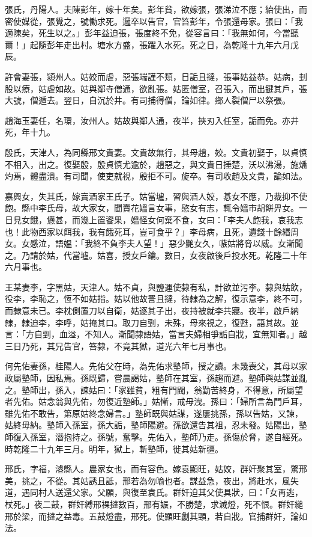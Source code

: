 \begin{pinyinscope}
張氏，丹陽人。夫陳彭年，嫁十年矣。彭年貧，欲嫁張，張涕泣不應；紿使出，而密使媒從，張覺之，號慟求死。邏卒以告官，官笞彭年，令張還母家。張曰：「我適陳矣，死生以之。」彭年益迫張，張度終不免，從容言曰：「我無如何，今當聽爾！」起隨彭年走出村。塘水方盛，張躍入水死。死之日，為乾隆十九年六月戊辰。

許會妻張，潁州人。姑姣而虐，惡張端謹不類，日詬且撻，張事姑益恭。姑病，刲股以療，姑虐如故。姑與鄰寺僧通，欲亂張。姑匿僧室，召張入，而出鍵其戶，張大號，僧遁去。翌日，自沉於井。有司捕得僧，論如律。鄉人裂僧尸以祭張。

趙海玉妻任，名環，汝州人。姑故與鄰人通，夜半，挾刃入任室，詬而免。亦井死，年十九。

殷氏，天津人，為同縣邢文貴妻。文貴故無行，其母趙，姣。文貴初娶于，以貞慎不相入，出之。復娶殷，殷貞慎尤逾於，趙惡之，與文貴日捶楚，沃以沸湯，施燔灼焉，體盡潰。有司聞，使吏就視，殷拒不可。旋卒。有司收趙及文貴，論如法。

嘉興女，失其氏，嫁賣酒家王氏子。姑當壚，習與酒人姣，惎女不應，乃裁抑不使飽。縣中李氏母，故大家女，聞賣花媼言女事，愍女有志，輒令媼市胡餅畀女。一日見女餓，憊甚，而幾上置餈果，媼怪女何棄不食，女曰：「李夫人飽我，哀我志也！此物西家以餌我，我有餓死耳，豈可食乎？」李母病，且死，遺錢十餘緡周女。女感泣，語媼：「我終不負李夫人望！」惡少艷女久，嗾姑將脅以威。女漸聞之。乃請於姑，代當壚。姑喜，授女戶鑰。數日，女夜啟後戶投水死。乾隆二十年六月事也。

王某妻李，字黑姑，天津人。姑不貞，與鹽運使隸有私，計欲並污李。隸與姑飲，役李，李恥之，恆不如姑指。姑以他故詈且撻，待隸為之解，復示意李，終不可，而隸意未已。李枕側置刀以自衛，姑逐其子出，夜持被就李共寢。夜半，啟戶納隸，隸迫李，李呼，姑掩其口。取刀自剄，未殊，母來視之，復甦，語其故。並言：「方自剄，血溢，不知人。漸聞隸語姑，當言夫婦相爭詬自戕，宜無知者。」越三日乃死，其兄告官，笞隸，不竟其獄，道光六年七月事也。

何先佑妻孫，桂陽人。先佑父在時，為先佑求塾師，授之讀。未幾喪父，其母以家政屬塾師，因私焉。孫既歸，嘗晨謁姑，塾師在其室，孫趨而避。塾師與姑謀並亂之。塾師出，孫入，諫姑曰：「家雖貧，粗有門閥，翁勤苦終身，不得意，所屬望者先佑。姑念翁與先佑，勿復近塾師。」姑慚，戒毋洩。孫曰：「婦所言為門戶耳，雖先佑不敢告，第原姑終念婦言。」塾師既與姑謀，遂屢挑孫，孫以告姑，又諫，姑終毋納。塾師入孫室，孫大詬，塾師陽避。孫欲還告其祖，忍未發。姑陽出，塾師復入孫室，潛抱持之。孫號，奮擊。先佑入，塾師乃走。孫傷於脅，遂自經死。時乾隆二十九年三月。明年，獄上，斬塾師，徙其姑新疆。

邢氏，字福，濬縣人。農家女也，而有容色。嫁袁顯旺，姑姣，群奸聚其室，驚邢美，挑之，不從。其姑誘且詆，邢若為勿喻也者。謀益急，夜出，將赴水，風失道，遇同村人送還父家。父願，與復至袁氏。群奸迫其父使具狀，曰：「女再逃，杖死。」夜二鼓，群奸縛邢裸撻數百，邢有娠，不勝楚，求滅燈，死不恨。群奸縋邢於梁，而撻之益毒。五鼓燈盡，邢死。使顯旺劙其頸，若自戕。官捕群奸，論如法。


\end{pinyinscope}
